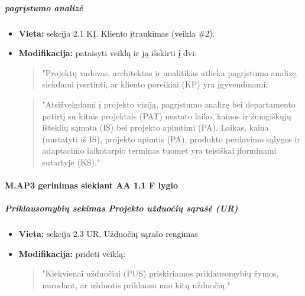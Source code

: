 \documentclass{article}
\begin{document}
\subparagraph{pagrįstumo analizė}
\begin{itemize}
    \item \textbf{Vieta:} sekcija 2.1 KĮ. Kliento įtraukimas (veikla \#2).
    \item \textbf{Modifikacija:} pataisyti veiklą ir ją išskirti į dvi:
    \begin{quote}
    
        "Projektų vadovas, architektas ir analitikas atlieka pagrįstumo analizę, siekdami įvertinti, ar kliento poreikiai (KP) yra įgyvendinami. 
    \end{quote}
    
    \begin{quote}
        "Atsižvelgdami į projekto viziją, pagrįstumo analizę bei departamento patirtį su kitais projektais (PAT) nustato laiko, kainos ir žmogiškųjų išteklių sąmata (IS) bei projekto apimtimi (PA). Laikas, kaina (nustatyti iš IS), projekto apimtis (PA), produkto perdavimo sąlygos ir adaptacinio laikotarpio terminas tuomet yra teisiškai įforminami sutartyje (KS)."
    \end{quote}
\end{itemize}

\paragraph{M.AP3 gerinimas siekiant AA 1.1 F lygio}

\subparagraph{Priklausomybių sekimas Projekto užduočių sąrašė (UR)}
\begin{itemize}
    \item \textbf{Vieta:} sekcija 2.3 UR. Užduočių sąrašo rengimas
    \item \textbf{Modifikacija:} pridėti veiklą:
    \begin{quote}
        "Kiekvienai užduočiai (PUS) priskiriamos priklausomybių žymos, nurodant, ar užduotis priklauso nuo kitų užduočių."
    \end{quote}
\end{itemize}
\end{document}
